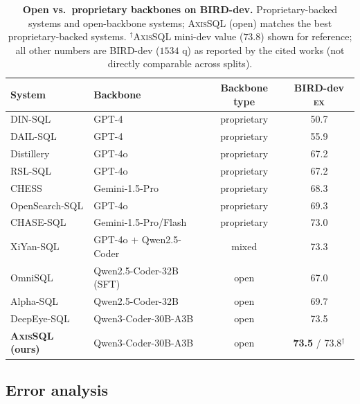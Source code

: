 \documentclass{article}
\newcommand{\sys}{\textsc{AxisSQL}\xspace}
\newcommand{\ex}{\textsc{ex}\xspace}
\newcommand{\bestcell}[1]{\textbf{#1}}
\begin{document}
\begin{table}[t]
\centering
\small
\caption{\textbf{Open vs.\ proprietary backbones on BIRD-dev.} Proprietary-backed systems and open-backbone systems; \sys{} (open) matches the best proprietary-backed systems. $^{\dagger}$\sys{} mini-dev value ($73.8$) shown for reference; all other numbers are BIRD-dev ($1534$ q) as reported by the cited works (not directly comparable across splits).}
\label{tab:openprop}
\begin{tabular}{@{}llcc@{}}
\toprule
\textbf{System} & \textbf{Backbone} & \textbf{Backbone type} & \textbf{BIRD-dev \ex} \\
\midrule
DIN-SQL \citep{pourreza2023dinsql}        & GPT-4               & proprietary & 50.7 \\
DAIL-SQL \citep{gao2024dailsql}           & GPT-4               & proprietary & 55.9 \\
Distillery \citep{maamari2024distillery}  & GPT-4o              & proprietary & 67.2 \\
RSL-SQL \citep{cao2024rslsql}             & GPT-4o              & proprietary & 67.2 \\
CHESS \citep{talaei2024chess}             & Gemini-1.5-Pro      & proprietary & 68.3 \\
OpenSearch-SQL \citep{xie2025opensearch}  & GPT-4o              & proprietary & 69.3 \\
CHASE-SQL \citep{pourreza2025chase}       & Gemini-1.5-Pro/Flash & proprietary & 73.0 \\
XiYan-SQL \citep{liu2025xiyan}            & GPT-4o $+$ Qwen2.5-Coder & mixed   & 73.3 \\
\midrule
OmniSQL \citep{li2025omnisql}             & Qwen2.5-Coder-32B (SFT) & open     & 67.0 \\
Alpha-SQL \citep{li2025alphasql}          & Qwen2.5-Coder-32B   & open        & 69.7 \\
DeepEye-SQL \citep{li2026deepeye}         & Qwen3-Coder-30B-A3B & open        & 73.5 \\
\textbf{\sys{} (ours)}                     & Qwen3-Coder-30B-A3B & open        & \bestcell{73.5} / 73.8$^{\dagger}$ \\
\bottomrule
\end{tabular}
\end{table}

\subsection{Error analysis}
\label{sec:error}
\end{document}
